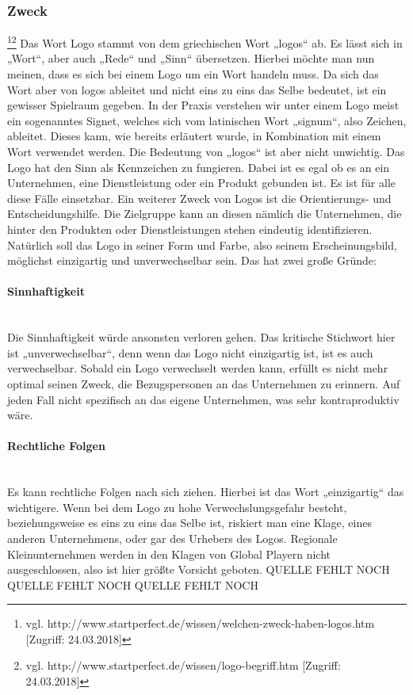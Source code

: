 \subsubsection{Zweck}\footnote{\label{} vgl. http://www.startperfect.de/wissen/welchen-zweck-haben-logos.htm [Zugriff: 24.03.2018]}\footnote{\label{} vgl. http://www.startperfect.de/wissen/logo-begriff.htm [Zugriff: 24.03.2018]}
Das Wort Logo stammt von dem griechischen Wort „logos“ ab. Es lässt sich in „Wort“, aber auch „Rede“ und „Sinn“ übersetzen. Hierbei möchte man nun meinen, dass es sich bei einem Logo um ein Wort handeln muss. Da sich das Wort aber von logos ableitet und nicht eins zu eins das Selbe bedeutet, ist ein gewisser Spielraum gegeben. In der Praxis verstehen wir unter einem Logo meist ein sogenanntes Signet, welches sich vom latinischen Wort „signum“, also Zeichen, ableitet. Dieses kann, wie bereits erläutert wurde, in Kombination mit einem Wort verwendet werden. Die Bedeutung von „logos“ ist aber nicht unwichtig. Das Logo hat den Sinn als Kennzeichen zu fungieren. Dabei ist es egal ob es an ein Unternehmen, eine Dienstleistung oder ein Produkt gebunden ist. Es ist für alle diese Fälle einsetzbar. Ein weiterer Zweck von Logos ist die Orientierungs- und Entscheidungshilfe. Die Zielgruppe kann an diesen nämlich die Unternehmen, die hinter den Produkten oder Dienstleistungen stehen eindeutig identifizieren.
\\ 
Natürlich soll das Logo in seiner Form und Farbe, also seinem Erscheinungsbild, möglichst einzigartig und unverwechselbar sein. Das hat zwei große Gründe:

\paragraph{Sinnhaftigkeit}
\leavevmode \\
Die Sinnhaftigkeit würde ansonsten verloren gehen. Das kritische Stichwort hier ist „unverwechselbar“, denn wenn das Logo nicht einzigartig ist, ist es auch verwechselbar. Sobald ein Logo verwechselt werden kann, erfüllt es nicht mehr optimal seinen Zweck, die Bezugspersonen an das Unternehmen zu erinnern. Auf jeden Fall nicht spezifisch an das eigene Unternehmen, was sehr kontraproduktiv wäre.

\paragraph{Rechtliche Folgen}
\leavevmode \\
Es kann rechtliche Folgen nach sich ziehen. Hierbei ist das Wort „einzigartig“ das wichtigere. Wenn bei dem Logo zu hohe Verwechslungsgefahr besteht, beziehungsweise es eins zu eins das Selbe ist, riskiert man eine Klage, eines anderen Unternehmens, oder gar des Urhebers des Logos. Regionale Kleinunternehmen werden in den Klagen von Global Playern nicht ausgeschlossen, also ist hier größte Vorsicht geboten.
QUELLE FEHLT NOCH QUELLE FEHLT NOCH QUELLE FEHLT NOCH

